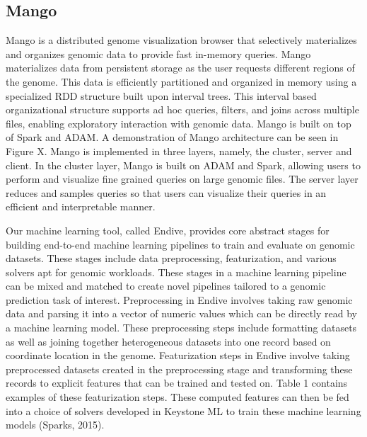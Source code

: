 \documentclass{sig-alternate-05-2015}
\begin{document}

\subsection{Mango}
Mango is a distributed genome visualization browser that selectively materializes and organizes genomic data to provide fast in-memory queries.  Mango materializes data from persistent storage as the user requests different regions of the genome. This data is efficiently partitioned and organized in memory using a specialized RDD structure built upon interval trees. This interval based organizational structure supports ad hoc queries, filters, and joins across multiple files, enabling exploratory interaction with genomic data.  Mango is built on top of Spark and ADAM. A demonstration of Mango architecture can be seen in Figure X. Mango is implemented in three layers, namely, the cluster, server and client. In the cluster layer, Mango is built on ADAM and Spark, allowing users to perform and visualize fine grained queries on large genomic files. The server layer reduces and samples queries so that users can visualize their queries in an efficient and interpretable manner.

%

Our machine learning tool, called Endive, provides core abstract stages for building end-to-end machine learning pipelines to train and evaluate on genomic datasets. These stages include data preprocessing, featurization, and various solvers apt for genomic workloads. These stages in a machine learning pipeline can be mixed and matched to create novel pipelines tailored to a genomic prediction task of interest.
Preprocessing in Endive involves taking raw genomic data and parsing it into a vector of numeric values which can be directly read by a machine learning model. These preprocessing steps include formatting datasets as well as joining together heterogeneous datasets into one record based on coordinate location in the genome.
Featurization steps in Endive involve taking preprocessed datasets created in the preprocessing stage and transforming these records to explicit features that can be trained and tested on. Table 1 contains examples of these featurization steps. These computed features can then be fed into a choice of solvers developed in Keystone ML to train these machine learning models (Sparks, 2015).
\end{document}
